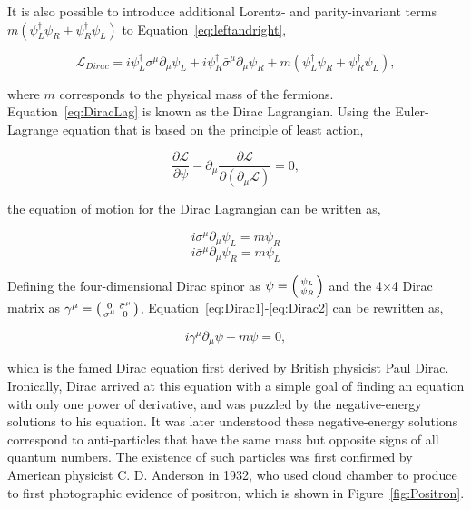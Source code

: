It is also possible to introduce additional Lorentz- and parity-invariant terms $m(\psi_{L}^{\dagger}\psi_{R}+\psi_{R}^{\dagger}\psi_{L})$ to Equation~\ref{eq:leftandright},

\begin{equation}
\label{eq:DiracLag}
\mathcal{L}_{Dirac}=i\psi_{L}^{\dagger}\sigma^{\mu}\partial_{\mu}\psi_{L}+i\psi_{R}^{\dagger}\bar{\sigma}^{\mu}\partial_{\mu}\psi_{R}+m(\psi_{L}^{\dagger}\psi_{R}+\psi_{R}^{\dagger}\psi_{L}),
\end{equation}

where $m$ corresponds to the physical mass of the fermions. Equation~\ref{eq:DiracLag} is known as the Dirac Lagrangian. Using the Euler-Lagrange equation that is based on the principle of least action,

\begin{equation}
\frac{\partial\mathcal{L}}{\partial\psi}-\partial_{\mu}\frac{\partial\mathcal{L}}{\partial(\partial_{\mu}\mathcal{L})}=0,
\end{equation}

the equation of motion for the Dirac Lagrangian can be written as,

\begin{equation}
\label{eq:Dirac1}
i\sigma^{\mu}\partial_{\mu}\psi_{L}=m\psi_{R}
\end{equation}
\begin{equation}
\label{eq:Dirac2}
i\bar{\sigma}^{\mu}\partial_{\mu}\psi_{R}=m\psi_{L}
\end{equation}

Defining the four-dimensional Dirac spinor as $\psi=\begin{psmallmatrix}\psi_{L}\\\psi_{R}\end{psmallmatrix}$ and the 4$\times$4 Dirac matrix as $\gamma^{\mu}=\begin{psmallmatrix}0&\bar{\sigma}^{\mu}\\\sigma^{\mu}&0\end{psmallmatrix}$, Equation~\ref{eq:Dirac1}-\ref{eq:Dirac2} can be rewritten as,

\begin{equation}
\label{eq:Dirac}
i\gamma^{\mu}\partial_{\mu}\psi-m\psi=0,
\end{equation}

which is the famed Dirac equation first derived by British physicist Paul Dirac. Ironically, Dirac arrived at this equation with a simple goal of finding an equation with only one power of derivative, and was puzzled by the negative-energy solutions to his equation. It was later understood these negative-energy solutions correspond to anti-particles that have the same mass but opposite signs of all quantum numbers. The existence of such particles was first confirmed by American physicist C. D. Anderson in 1932, who used cloud chamber to produce to first photographic evidence of positron, which is shown in Figure~\ref{fig:Positron}.

